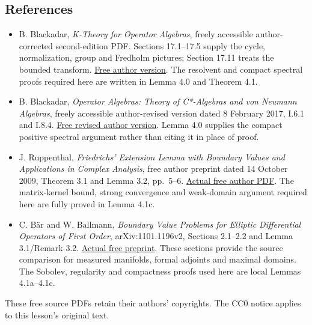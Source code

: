 \documentclass[
  11pt,
]{article}
\begin{document}
\subsection{References}\label{references}

\begin{itemize}
\item
  B. Blackadar, \emph{K-Theory for Operator Algebras}, freely accessible
  author-corrected second-edition PDF. Sections 17.1--17.5 supply the
  cycle, normalization, group and Fredholm pictures; Section 17.11
  treats the bounded transform.
  \href{https://www.bruceblackadar.com/Mathematics/book6.pdf}{Free
  author version}. The resolvent and compact spectral proofs required
  here are written in Lemma 4.0 and Theorem 4.1.
\item
  B. Blackadar, \emph{Operator Algebras: Theory of C*-Algebras and von
  Neumann Algebras}, freely accessible author-revised version dated 8
  February 2017, I.6.1 and I.8.4.
  \href{https://www.bruceblackadar.com/Mathematics/Cycr.pdf}{Free
  revised author version}. Lemma 4.0 supplies the compact positive
  spectral argument rather than citing it in place of proof.
\item
  J. Ruppenthal, \emph{Friedrichs' Extension Lemma with Boundary Values
  and Applications in Complex Analysis}, free author preprint dated 14
  October 2009, Theorem 3.1 and Lemma 3.2, pp.~5--6.
  \href{https://www2.math.uni-wuppertal.de/~ruppenth/papers/friedrichs14102009.pdf}{Actual
  free author PDF}. The matrix-kernel bound, strong convergence and
  weak-domain argument required here are fully proved in Lemma 4.1c.
\item
  C. Bär and W. Ballmann, \emph{Boundary Value Problems for Elliptic
  Differential Operators of First Order}, arXiv:1101.1196v2, Sections
  2.1--2.2 and Lemma 3.1/Remark 3.2.
  \href{https://arxiv.org/abs/1101.1196}{Actual free preprint}. These
  sections provide the source comparison for measured manifolds, formal
  adjoints and maximal domains. The Sobolev, regularity and compactness
  proofs used here are local Lemmas 4.1a--4.1c.
\end{itemize}

These free source PDFs retain their authors' copyrights. The CC0 notice
applies to this lesson's original text.
\end{document}
